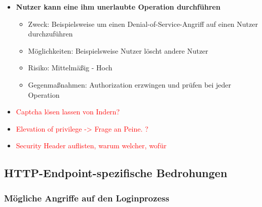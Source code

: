 \documentclass[12pt,DIV14,BCOR10mm,a4paper,twoside,parskip=half-,headsepline,headinclude,english,ngerman,bibliography=totocnumbered]{scrreprt}
\begin{document}
\begin{itemize}
  \item \textbf{Nutzer kann eine ihm unerlaubte Operation durchführen}
  \begin{itemize}
  \item Zweck: Beispielsweise um einen Denial-of-Service-Angriff auf einen Nutzer durchzuführen
  \item Möglichkeiten: Beispielsweise Nutzer löscht andere Nutzer
  \item Risiko: Mittelmäßig - Hoch
  \item Gegenmaßnahmen: Authorization erzwingen und prüfen bei jeder Operation
  \end{itemize}

  \item \textcolor{red}{Captcha lösen lassen von Indern?}
  \item \textcolor{red}{Elevation of privilege -> Frage an Peine. ?}
  \item \textcolor{red}{Security Header auflisten, warum welcher, wofür}
\end{itemize}

\subsection{HTTP-Endpoint-spezifische Bedrohungen}

\subsubsection{Mögliche Angriffe auf den Loginprozess}
\end{document}
